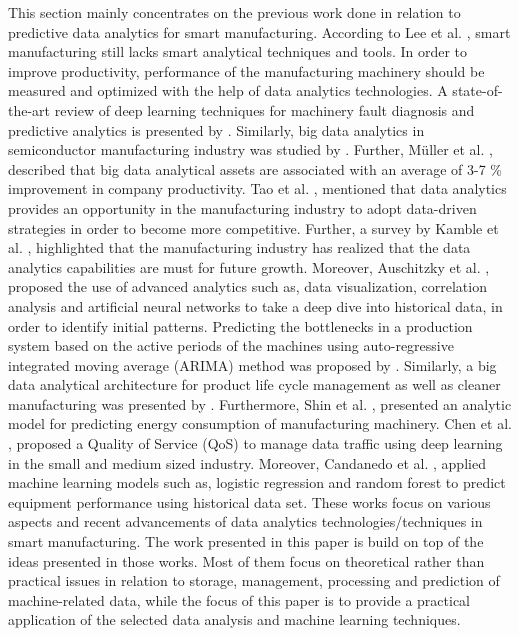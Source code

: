 \documentclass[runningheads]{llncs}
\begin{document}
This section mainly concentrates on the previous work done in relation to predictive data analytics for smart manufacturing. According to Lee et al. \cite{Lee}, smart manufacturing still lacks smart analytical techniques and tools. In order to improve productivity, performance of the manufacturing machinery should be measured and optimized with the help of data analytics technologies. A state-of-the-art review of deep learning techniques for machinery fault diagnosis and predictive analytics is presented by \cite{Wang}. Similarly, big data analytics in semiconductor manufacturing industry was studied by \cite{Moyne}. Further, M\"uller et al. \cite{Muller}, described that big data analytical assets are associated with an average of 3-7 \% improvement in company productivity. Tao et al. \cite{Tao}, mentioned that data analytics provides an opportunity in the manufacturing industry to adopt data-driven strategies in order to become more competitive. Further, a survey by Kamble et al. \cite{Kamble}, highlighted that the manufacturing industry has realized that the data analytics capabilities are must for future growth. Moreover, Auschitzky et al. \cite{Auschitzky}, proposed the use of advanced analytics such as, data visualization, correlation analysis and artificial neural networks to take a deep dive into historical data, in order to identify initial patterns. Predicting the bottlenecks in a production system based on the active periods of the machines using auto-regressive integrated moving average (ARIMA) method was proposed by \cite{Subramaniyan}. Similarly, a big data analytical architecture for product life cycle management as well as cleaner manufacturing was presented by \cite{Zhang}. Furthermore, Shin et al. \cite{Shin}, presented an analytic model for predicting energy consumption of manufacturing machinery. Chen et al. \cite{Chen}, proposed a Quality of Service (QoS) to manage data traffic using deep learning in the small and medium sized industry. Moreover, Candanedo et al. \cite{Candanedo}, applied machine learning models such as, logistic regression and random forest to predict equipment performance using historical data set. These works focus on various aspects and recent advancements of data analytics technologies/techniques in smart manufacturing. The work presented in this paper is build on top of the ideas presented in those works. Most of them focus on theoretical rather than practical issues in relation to storage, management, processing and prediction of machine-related data, while the focus of this paper is to provide a practical application of the selected data analysis and machine learning techniques.
\end{document}
